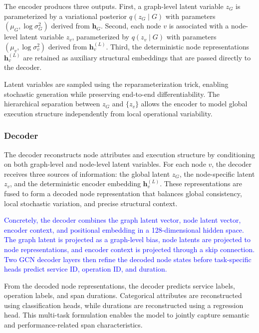 \documentclass[sigconf,review]{acmart}
\begin{document}
The encoder produces three outputs. First, a graph-level latent variable $z_G$ is parameterized by a variational posterior $q(z_G \mid G)$ with parameters $(\mu_G, \log \sigma_G^2)$ derived from $\mathbf{h}_G$. Second, each node $v$ is associated with a node-level latent variable $z_v$, parameterized by $q(z_v \mid G)$ with parameters $(\mu_v, \log \sigma_v^2)$ derived from $\mathbf{h}_v^{(L)}$. Third, the deterministic node representations $\mathbf{h}_v^{(L)}$ are retained as auxiliary structural embeddings that are passed directly to the decoder.

Latent variables are sampled using the reparameterization trick, enabling stochastic generation while preserving end-to-end differentiability. The hierarchical separation between $z_G$ and $\{z_v\}$ allows the encoder to model global execution structure independently from local operational variability.

\subsubsection{Decoder}

The decoder reconstructs node attributes and execution structure by conditioning on both graph-level and node-level latent variables. For each node $v$, the decoder receives three sources of information: the global latent $z_G$, the node-specific latent $z_v$, and the deterministic encoder embedding $\mathbf{h}_v^{(L)}$. These representations are fused to form a decoded node representation that balances global consistency, local stochastic variation, and precise structural context.

\textcolor{blue}{Concretely, the decoder combines the graph latent vector, node latent vector, encoder context, and positional embedding in a 128-dimensional hidden space. The graph latent is projected as a graph-level bias, node latents are projected to node representations, and encoder context is projected through a skip connection. Two GCN decoder layers then refine the decoded node states before task-specific heads predict service ID, operation ID, and duration.}

From the decoded node representations, the decoder predicts service labels, operation labels, and span durations. Categorical attributes are reconstructed using classification heads, while durations are reconstructed using a regression head. This multi-task formulation enables the model to jointly capture semantic and performance-related span characteristics.
\end{document}
